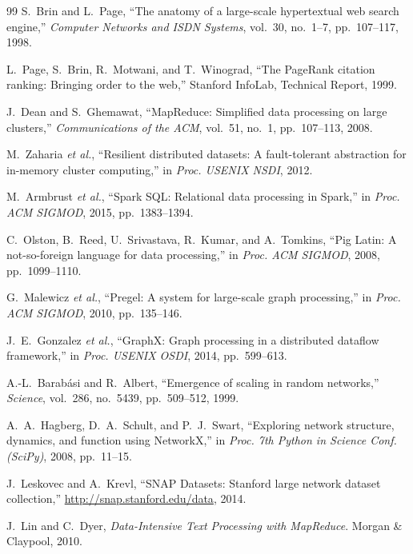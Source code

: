 \begin{thebibliography}{99}
 S.~Brin and L.~Page, ``The anatomy of a large-scale
hypertextual web search engine,'' \emph{Computer Networks and ISDN Systems},
vol.~30, no.~1--7, pp.~107--117, 1998.

 L.~Page, S.~Brin, R.~Motwani, and T.~Winograd, ``The PageRank
citation ranking: Bringing order to the web,'' Stanford InfoLab, Technical
Report, 1999.

 J.~Dean and S.~Ghemawat, ``MapReduce: Simplified data
processing on large clusters,'' \emph{Communications of the ACM}, vol.~51,
no.~1, pp.~107--113, 2008.

 M.~Zaharia \emph{et al.}, ``Resilient distributed datasets:
A fault-tolerant abstraction for in-memory cluster computing,'' in \emph{Proc.
USENIX NSDI}, 2012.

 M.~Armbrust \emph{et al.}, ``Spark SQL: Relational data
processing in Spark,'' in \emph{Proc. ACM SIGMOD}, 2015, pp.~1383--1394.

 C.~Olston, B.~Reed, U.~Srivastava, R.~Kumar, and
A.~Tomkins, ``Pig Latin: A not-so-foreign language for data processing,'' in
\emph{Proc. ACM SIGMOD}, 2008, pp.~1099--1110.

 G.~Malewicz \emph{et al.}, ``Pregel: A system for
large-scale graph processing,'' in \emph{Proc. ACM SIGMOD}, 2010,
pp.~135--146.

 J.~E.~Gonzalez \emph{et al.}, ``GraphX: Graph processing
in a distributed dataflow framework,'' in \emph{Proc. USENIX OSDI}, 2014,
pp.~599--613.

 A.-L.~Barab\'asi and R.~Albert, ``Emergence of scaling in
random networks,'' \emph{Science}, vol.~286, no.~5439, pp.~509--512, 1999.

 A.~A.~Hagberg, D.~A.~Schult, and P.~J.~Swart, ``Exploring
network structure, dynamics, and function using NetworkX,'' in \emph{Proc. 7th
Python in Science Conf. (SciPy)}, 2008, pp.~11--15.

 J.~Leskovec and A.~Krevl, ``SNAP Datasets: Stanford large
network dataset collection,'' \url{http://snap.stanford.edu/data}, 2014.

 J.~Lin and C.~Dyer, \emph{Data-Intensive Text Processing with
MapReduce}. Morgan \& Claypool, 2010.
\end{thebibliography}
